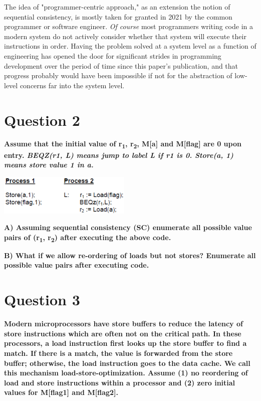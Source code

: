 \documentclass{article}
\begin{document}
\par The idea of "programmer-centric approach," as an extension the notion of sequential consistency, is mostly taken for granted in 2021 by the common programmer or software engineer.
\textit{Of course} most programmers writing code in a modern system do not actively consider whether that system will execute their instructions in order.
Having the problem solved at a system level as a function of engineering has opened the door for significant strides in programming development over the period of time since this paper's publication, and that progress probably would have been impossible if not for the abstraction of low-level concerns far into the system level.

\newpage

\section{Question 2}
\textbf{Assume that the initial value of r\textsubscript{1}, r\textsubscript{2}, M[a] and M[flag] are 0 upon entry. \textit{BEQZ(r1, L) means jump to label L if r1 is 0. Store(a, 1) means store value 1 in a.}}

    {\centering
        \includegraphics[width=2.5in]{csci-8150/final-exam-1/images/arch_final_2.png}\par 
    }
    
\textbf{A) Assuming sequential consistency (SC) enumerate all possible value pairs of (r\textsubscript{1}, r\textsubscript{2}) after executing the above code.}

\textbf{B) What if we allow re-ordering of loads but not stores? Enumerate all possible value pairs after executing code.}

\newpage
\section{Question 3}

\textbf{Modern microprocessors have store buffers to reduce the latency of store instructions which are often not on the critical path. In these processors, a load instruction first looks up the store buffer to find a match. If there is a match, the value is forwarded from the store buffer; otherwise, the load instruction goes to the data cache. We call this mechanism load-store-optimization. Assume (1) no reordering of load and store instructions within a processor and (2) zero initial values for M[flag1] and M[flag2].}
\end{document}
